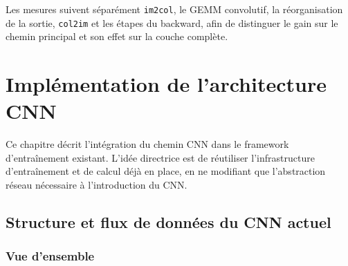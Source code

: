\documentclass[a4paper,11pt,oneside]{article}
\begin{document}
Les mesures suivent séparément \texttt{im2col}, le GEMM convolutif, la réorganisation de la sortie, \texttt{col2im} et les étapes du backward, afin de distinguer le gain sur le chemin principal et son effet sur la couche complète.

\section{Implémentation de l'architecture CNN}

Ce chapitre décrit l'intégration du chemin CNN dans le framework d'entraînement existant. L'idée directrice est de réutiliser l'infrastructure d'entraînement et de calcul déjà en place, en ne modifiant que l'abstraction réseau nécessaire à l'introduction du CNN.

\subsection{Structure et flux de données du CNN actuel}

\subsubsection{Vue d'ensemble}
\end{document}
